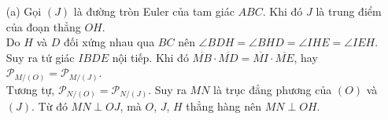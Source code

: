         \begin{solution}
            \hfill
            \begin{itemize}
                \item[(a)] Gọi \((J)\) là đường tròn Euler của tam giác \(ABC\). Khi đó \(J\) là trung điểm của đoạn thẳng \(OH\).\\
                Do \(H\) và \(D\) đối xứng nhau qua \(BC\) nên \(\angle BDH = \angle BHD = \angle IHE = \angle IEH\). Suy ra tứ giác \(IBDE\) nội tiếp. Khi đó \(\overline{MB} \cdot \overline{MD} = \overline{MI} \cdot \overline{ME}\), hay \(\mathcal{P}_{M/(O)} = \mathcal{P}_{M/(J)}\).\\
                Tương tự, \(\mathcal{P}_{N/(O)} = \mathcal{P}_{N/(J)}\). Suy ra \(MN\) là trục đẳng phương của \((O)\) và \((J)\). Từ đó \(MN \perp OJ\), mà \(O\), \(J\), \(H\) thẳng hàng nên \(MN \perp OH\).


\end{itemize}
\end{solution}
